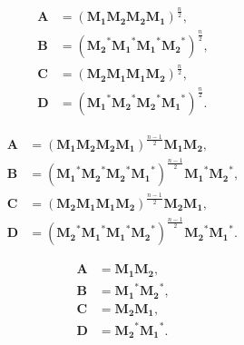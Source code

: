 \documentclass[a4paper,11pt,twoside,openright]{book}
\def\lthtmlcheckvsize{\ifdim\ht\sizebox<\vsize 
  \ifdim\wd\sizebox<\hsize\expandafter\hfill\fi \expandafter\vfill
  \else\expandafter\vss\fi}%
\begin{document}
{\newpage\clearpage
\setcounter{equation}{60}
%
\begin{subequations}\begin{align}
\mathbf{A} &= \left( \mathbf{M_1} \mathbf{M_2} \mathbf{M_2} \mathbf{M_1} \right)^{\frac{n}{2}}, \\
\mathbf{B} &= \left( \mathbf{M_2}^* \mathbf{M_1}^* \mathbf{M_1}^* \mathbf{M_2}^* \right)^{\frac{n}{2}}, \\
\mathbf{C} &= \left( \mathbf{M_2} \mathbf{M_1} \mathbf{M_1} \mathbf{M_2} \right)^{\frac{n}{2}}, \\
\mathbf{D} &= \left( \mathbf{M_1}^* \mathbf{M_2}^* \mathbf{M_2}^* \mathbf{M_1}^* \right)^{\frac{n}{2}}.
\end{align}\end{subequations}%
\lthtmldisplayZ
\lthtmlcheckvsize\clearpage}

{\newpage\clearpage
\setcounter{equation}{61}
%
\begin{subequations}\begin{align}
\mathbf{A} &= \left( \mathbf{M_1} \mathbf{M_2} \mathbf{M_2} \mathbf{M_1} \right)^{\frac{n-1}{2}} \mathbf{M_1} \mathbf{M_2}, \\
\mathbf{B} &= \left( \mathbf{M_1}^* \mathbf{M_2}^* \mathbf{M_2}^* \mathbf{M_1}^* \right)^{\frac{n-1}{2}} \mathbf{M_1}^* \mathbf{M_2}^*, \\
\mathbf{C} &= \left( \mathbf{M_2} \mathbf{M_1} \mathbf{M_1} \mathbf{M_2} \right)^{\frac{n-1}{2}} \mathbf{M_2} \mathbf{M_1}, \\
\mathbf{D} &= \left( \mathbf{M_2}^* \mathbf{M_1}^* \mathbf{M_1}^* \mathbf{M_2}^* \right)^{\frac{n-1}{2}} \mathbf{M_2}^* \mathbf{M_1}^*.
\end{align}\end{subequations}%
\lthtmldisplayZ
\lthtmlcheckvsize\clearpage}

{\newpage\clearpage
\setcounter{equation}{62}
%
\begin{subequations}\begin{align}
\mathbf{A} &= \mathbf{M_1} \mathbf{M_2}, \\
\mathbf{B} &= \mathbf{M_1}^* \mathbf{M_2}^*, \\
\mathbf{C} &= \mathbf{M_2} \mathbf{M_1}, \\
\mathbf{D} &= \mathbf{M_2}^* \mathbf{M_1}^*.
\end{align}\end{subequations}%
\lthtmldisplayZ
\lthtmlcheckvsize\clearpage}
\end{document}
